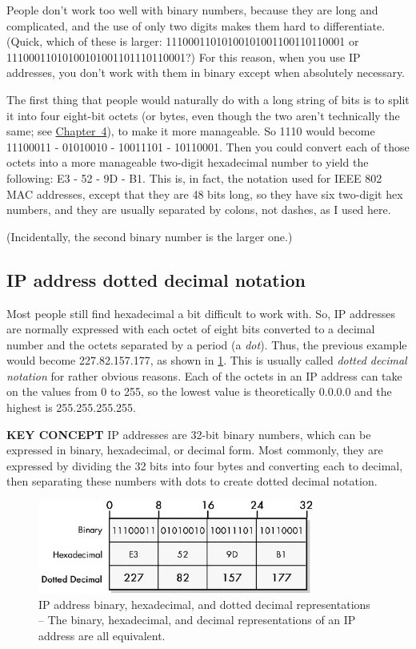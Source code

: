\documentclass[b5paper,11pt]{memoir}
\begin{document}
People don't work too well with binary numbers, because they are long
and complicated, and the use of only two digits makes them hard to
differentiate. (Quick, which of these is larger:
11100011010100101001100110110001 or 11100011010100101001101110110001?)
For this reason, when you use IP addresses, you don't work with them in
binary except when absolutely necessary.

The first thing that people would naturally do with a long string of
bits is to split it into four eight-bit octets (or bytes, even though
the two aren't technically the same; see \protect\hyperlink{ch04.html}{Chapter~4}), to make it more manageable.
So 1110 would become 11100011 - 01010010 -
10011101 - 10110001. Then you could convert each of those octets into a
more manageable two-digit hexadecimal number to yield the following: E3
- 52 - 9D - B1. This is, in fact, the notation used for IEEE 802 MAC
addresses, except that they are 48 bits long, so they have six two-digit
hex numbers, and they are usually separated by colons, not dashes, as I
used here.

(Incidentally, the second binary number is the larger one.)



\subsection{IP address dotted decimal notation}

Most people still find hexadecimal a bit difficult to work with.
So, IP addresses are normally expressed with each octet of eight bits converted to a
decimal number and the octets separated by a period (a {\emph{dot}}).
Thus, the previous example would become 227.82.157.177, as shown in \cref{fig:ip-address-notation}.
This is usually called {\emph{dotted decimal notation}} for rather
obvious reasons. Each of the octets in an IP address can take on the
values from 0 to 255, so the lowest value is theoretically 0.0.0.0 and
the highest is 255.255.255.255.

{\textbf{KEY CONCEPT}} IP addresses are 32-bit binary numbers, which can
be expressed in binary, hexadecimal, or decimal form. Most commonly,
they are expressed by dividing the 32 bits into four bytes and
converting each to decimal, then separating these numbers with dots to
create dotted decimal notation.

\begin{figure}
   \centering
   \includegraphics[width=.7\textwidth]{images/ip-address-notation.jpg}
   \caption{IP address binary, hexadecimal, and dotted decimal representations -- The binary, hexadecimal, and decimal representations of an IP address are all equivalent.}
   \label{fig:ip-address-notation}
\end{figure}
\end{document}
